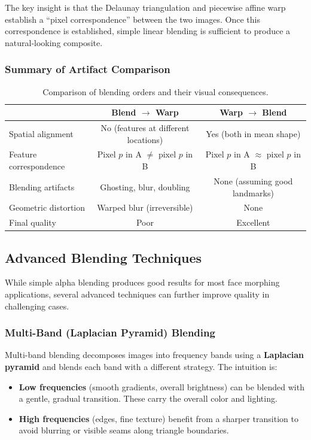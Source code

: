 The key insight is that the Delaunay triangulation and piecewise affine warp establish a
``pixel correspondence'' between the two images. Once this correspondence is established,
simple linear blending is sufficient to produce a natural-looking composite.

\subsubsection{Summary of Artifact Comparison}

\begin{table}[htbp]
\centering
\caption{Comparison of blending orders and their visual consequences.}
\label{tab:blend-order}
\begin{tabular}{@{}lcc@{}}
\toprule
& \textbf{Blend $\rightarrow$ Warp} & \textbf{Warp $\rightarrow$ Blend} \\
\midrule
Spatial alignment & No (features at different locations) & Yes (both in mean shape) \\
Feature correspondence & Pixel $p$ in A $\neq$ pixel $p$ in B & Pixel $p$ in A $\approx$ pixel $p$ in B \\
Blending artifacts & Ghosting, blur, doubling & None (assuming good landmarks) \\
Geometric distortion & Warped blur (irreversible) & None \\
Final quality & Poor & Excellent \\
\bottomrule
\end{tabular}
\end{table}

\subsection{Advanced Blending Techniques}

While simple alpha blending produces good results for most face morphing applications, several
advanced techniques can further improve quality in challenging cases.

\subsubsection{Multi-Band (Laplacian Pyramid) Blending}

Multi-band blending decomposes images into frequency bands using a \textbf{Laplacian pyramid}
and blends each band with a different strategy. The intuition is:

\begin{itemize}
    \item \textbf{Low frequencies} (smooth gradients, overall brightness) can be blended with a
          gentle, gradual transition. These carry the overall color and lighting.
    \item \textbf{High frequencies} (edges, fine texture) benefit from a sharper transition to
          avoid blurring or visible seams along triangle boundaries.
\end{itemize}


